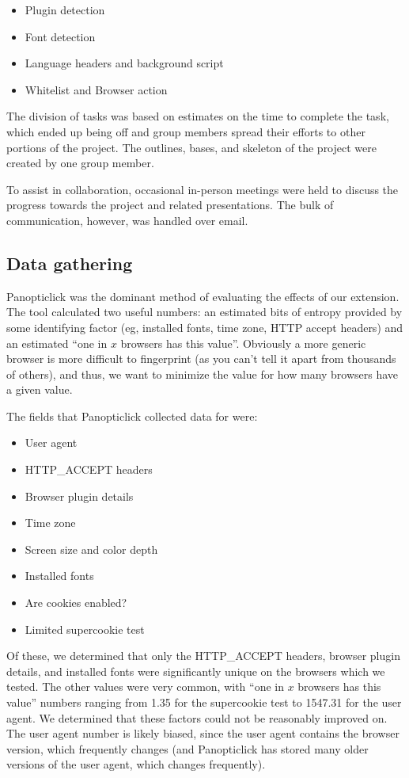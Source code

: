 \documentclass[12pt,a4paper]{article}
\begin{document}
\begin{itemize}
	\item Plugin detection
	\item Font detection
	\item Language headers and background script
	\item Whitelist and Browser action
\end{itemize}

The division of tasks was based on estimates on the time to complete the task, which ended up being off and group members spread their efforts to other portions of the project. The outlines, bases, and skeleton of the project were created by one group member.

To assist in collaboration, occasional in-person meetings were held to discuss the progress towards the project and related presentations. The bulk of communication, however, was handled over email.

\subsection{Data gathering}
Panopticlick was the dominant method of evaluating the effects of our extension. The tool calculated two useful numbers: an estimated bits of entropy provided by some identifying factor (eg, installed fonts, time zone, HTTP accept headers) and an estimated ``one in $x$ browsers has this value''. Obviously a more generic browser is more difficult to fingerprint (as you can't tell it apart from thousands of others), and thus, we want to minimize the value for how many browsers have a given value.

The fields that Panopticlick collected data for were:

\begin{itemize}
	\item User agent
	\item HTTP\_ACCEPT headers
	\item Browser plugin details
	\item Time zone
	\item Screen size and color depth
	\item Installed fonts
	\item Are cookies enabled?
	\item Limited supercookie test
\end{itemize}

Of these, we determined that only the HTTP\_ACCEPT headers, browser plugin details, and installed fonts were significantly unique on the browsers which we tested. The other values were very common, with ``one in $x$ browsers has this value'' numbers ranging from 1.35 for the supercookie test to 1547.31 for the user agent. We determined that these factors could not be reasonably improved on. The user agent number is likely biased, since the user agent contains the browser version, which frequently changes (and Panopticlick has stored many older versions of the user agent, which changes frequently).
\end{document}
